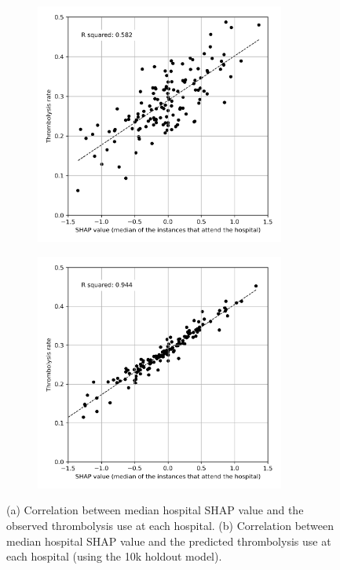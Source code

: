 \begin{figure}[!h]
\centering
\begin{subfigure}{.49\textwidth}
  \centering
    \includegraphics[width=0.9\textwidth]{./images/03c_xgb_10_features_attended_hosp_shap_value}
    \caption{}
  \label{fig:shap_correlation_subfigure_a}
\end{subfigure}
\begin{subfigure}{.49\textwidth}
  \centering
    \includegraphics[width=0.9\textwidth]{./images/04_xgb_10_features_10k_cohort_attended_hosp_shap_value}
    \caption{}
  \label{fig:shap_correlation_subfigure_b}
\end{subfigure}
\caption{(a) Correlation between median hospital SHAP value and the observed thrombolysis use at each hospital. (b) Correlation between median hospital SHAP value and the predicted thrombolysis use at each hospital (using the 10k holdout model).}
\end{figure}


